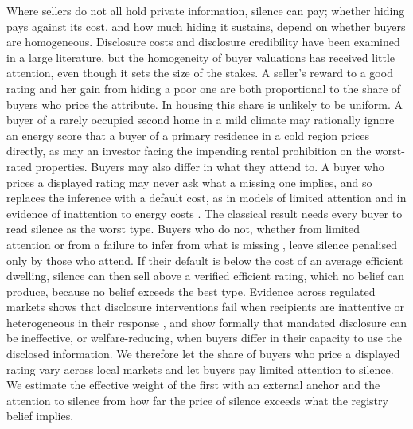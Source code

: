 Where sellers do not all hold private information, silence can pay; whether hiding pays against its cost, and how much
hiding it sustains, depend on whether buyers are homogeneous.
Disclosure costs and disclosure credibility have been examined in a large literature, but
the homogeneity of buyer valuations has received little attention, even though it sets the size of
the stakes. A seller's reward to a good rating and her gain from hiding a poor one are both
proportional to the share of buyers who price the attribute. In housing this share is unlikely to
be uniform. A buyer of a rarely occupied second home in a mild climate
may rationally ignore an energy score that a buyer of a primary residence in a cold region
prices directly, as may an investor facing the impending rental prohibition on the worst-rated
properties. Buyers may also differ in what they attend to. A buyer who prices a displayed rating may never
ask what a missing one implies, and so replaces the inference with a default cost, as in models of
limited attention \citep{gabaix_sparsity_2014} and in evidence of inattention to energy costs
\citep{sallee_rational_2014}. The classical result needs every buyer to read silence as the worst
type. Buyers who do not, whether from limited attention \citep{hirshleifer_limited_2003} or from a
failure to infer from what is missing \citep{eyster_cursed_2005}, leave silence penalised only by
those who attend. If their default is below the cost of an average efficient dwelling, silence can
then sell above a verified efficient rating, which no belief can produce, because no belief
exceeds the best type. Evidence across regulated markets shows that disclosure interventions fail
when recipients are inattentive or heterogeneous in their response
\citep{loewenstein_disclosure_2014, benshahar_failure_2011}, and
\citet{fishman_mandatory_2003} show formally that mandated disclosure can be ineffective, or
welfare-reducing, when buyers differ in their capacity to use the disclosed information. We
therefore let the share of buyers who price a displayed rating vary across local markets and let
buyers pay limited attention to silence. We estimate the effective weight of the first with an
external anchor and the attention to silence from how far the price of silence exceeds what the
registry belief implies.

